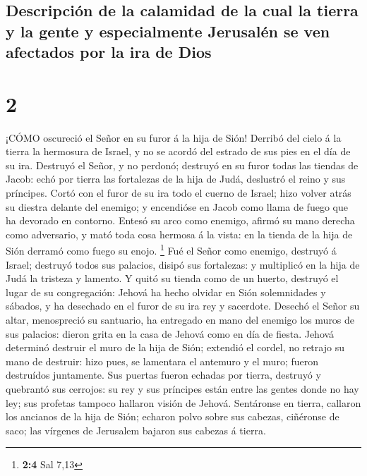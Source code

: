 \hypertarget{descripciuxf3n-de-la-calamidad-de-la-cual-la-tierra-y-la-gente-y-especialmente-jerusaluxe9n-se-ven-afectados-por-la-ira-de-dios}{%
\subsection{Descripción de la calamidad de la cual la tierra y la gente
y especialmente Jerusalén se ven afectados por la ira de
Dios}\label{descripciuxf3n-de-la-calamidad-de-la-cual-la-tierra-y-la-gente-y-especialmente-jerusaluxe9n-se-ven-afectados-por-la-ira-de-dios}}

\hypertarget{section-1}{%
\section{2}\label{section-1}}

 ¡CÓMO oscureció el Señor en su furor á la hija de Sión!
Derribó del cielo á la tierra la hermosura de Israel, y no se acordó del
estrado de sus pies en el día de su ira.  Destruyó el Señor,
y no perdonó; destruyó en su furor todas las tiendas de Jacob: echó por
tierra las fortalezas de la hija de Judá, deslustró el reino y sus
príncipes.  Cortó con el furor de su ira todo el cuerno de
Israel; hizo volver atrás su diestra delante del enemigo; y encendióse
en Jacob como llama de fuego que ha devorado en contorno. 
Entesó su arco como enemigo, afirmó su mano derecha como adversario, y
mató toda cosa hermosa á la vista: en la tienda de la hija de Sión
derramó como fuego su enojo. \footnote{\textbf{2:4} Sal 7,13}
 Fué el Señor como enemigo, destruyó á Israel; destruyó
todos sus palacios, disipó sus fortalezas: y multiplicó en la hija de
Judá la tristeza y lamento.  Y quitó su tienda como de un
huerto, destruyó el lugar de su congregación: Jehová ha hecho olvidar en
Sión solemnidades y sábados, y ha desechado en el furor de su ira rey y
sacerdote.  Desechó el Señor su altar, menospreció su
santuario, ha entregado en mano del enemigo los muros de sus palacios:
dieron grita en la casa de Jehová como en día de fiesta. 
Jehová determinó destruir el muro de la hija de Sión; extendió el
cordel, no retrajo su mano de destruir: hizo pues, se lamentara el
antemuro y el muro; fueron destruídos juntamente.  Sus
puertas fueron echadas por tierra, destruyó y quebrantó sus cerrojos: su
rey y sus príncipes están entre las gentes donde no hay ley; sus
profetas tampoco hallaron visión de Jehová.  Sentáronse en
tierra, callaron los ancianos de la hija de Sión; echaron polvo sobre
sus cabezas, ciñéronse de saco; las vírgenes de Jerusalem bajaron sus
cabezas á tierra.

